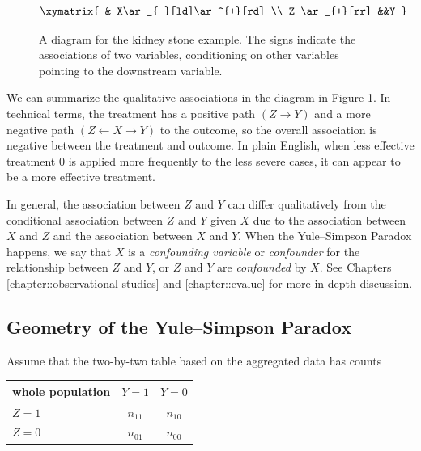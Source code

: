 \begin{figure}
$$
\xymatrix{
 & X\ar_{-}[ld]\ar^{+}[rd] \\ 
Z \ar_{+}[rr] &&Y 
}
$$
\caption{A diagram for the kidney stone example. The signs indicate the associations of two variables, conditioning on other variables pointing to the downstream variable.}\label{fig::kidney-stone}
\end{figure}




We can summarize the qualitative associations in the diagram in Figure \ref{fig::kidney-stone}. In technical terms, the treatment has a positive path $(Z\rightarrow Y)$ and a more negative path $(Z\leftarrow X \rightarrow Y)$ to the outcome, so the overall association is negative between the treatment and outcome. 
In plain English, when less effective treatment 0 is applied more frequently to the less severe cases, it can appear to be a more effective treatment. 




In general, the association between $Z$ and $Y$ can differ qualitatively from the conditional association between $Z$ and $Y$ given $X$ due to the association between $X$ and $Z$ and the association between $X$ and $Y$.  When the Yule--Simpson Paradox happens,  we say that $X$ is a {\it confounding variable} or {\it confounder} for the relationship between $Z$ and $Y$, or $Z$ and $Y$ are {\it confounded} by $X$.  See Chapters \ref{chapter::observational-studies} and \ref{chapter::evalue} for more in-depth discussion. 
 




\subsection{Geometry of the Yule--Simpson Paradox}


Assume that the two-by-two table based on the aggregated data has counts


 \begin{center}
\begin{tabular}{lcc}
\hline 
 whole population       & $Y =1$ & $Y =0$\\\hline
$Z =1$ & $n_{11}$ & $n_{10}$\\ 
$Z =0$ & $n_{01}$ & $n_{00}$\\
\hline 
\end{tabular}
\end{center}


